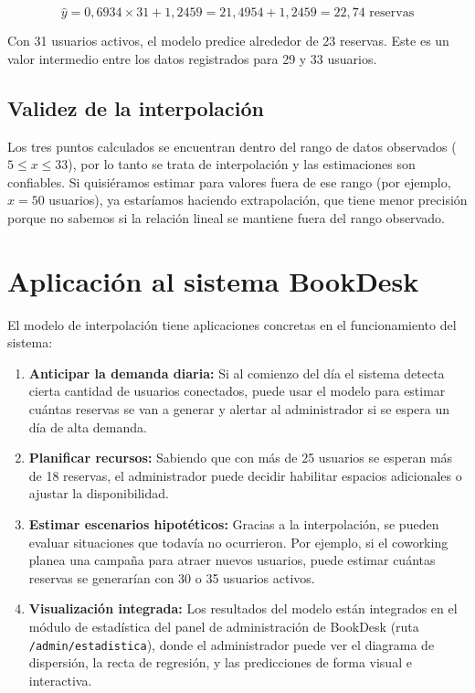 \documentclass[12pt,a4paper]{article}
\begin{document}
\vspace{4pt}
$$\hat{y} = 0{,}6934 \times 31 + 1{,}2459 = 21{,}4954 + 1{,}2459 = 22{,}74 \text{ reservas}$$
\vspace{4pt}

Con 31 usuarios activos, el modelo predice alrededor de 23 reservas. Este es un valor intermedio entre los datos registrados para 29 y 33 usuarios.

\subsection{Validez de la interpolación}

Los tres puntos calculados se encuentran dentro del rango de datos observados ($5 \leq x \leq 33$), por lo tanto se trata de interpolación y las estimaciones son confiables. Si quisiéramos estimar para valores fuera de ese rango (por ejemplo, $x = 50$ usuarios), ya estaríamos haciendo extrapolación, que tiene menor precisión porque no sabemos si la relación lineal se mantiene fuera del rango observado.

\section{Aplicación al sistema BookDesk}

El modelo de interpolación tiene aplicaciones concretas en el funcionamiento del sistema:

\begin{enumerate}[itemsep=10pt]
  \item \textbf{Anticipar la demanda diaria:} Si al comienzo del día el sistema detecta cierta cantidad de usuarios conectados, puede usar el modelo para estimar cuántas reservas se van a generar y alertar al administrador si se espera un día de alta demanda.

  \item \textbf{Planificar recursos:} Sabiendo que con más de 25 usuarios se esperan más de 18 reservas, el administrador puede decidir habilitar espacios adicionales o ajustar la disponibilidad.

  \item \textbf{Estimar escenarios hipotéticos:} Gracias a la interpolación, se pueden evaluar situaciones que todavía no ocurrieron. Por ejemplo, si el coworking planea una campaña para atraer nuevos usuarios, puede estimar cuántas reservas se generarían con 30 o 35 usuarios activos.

  \item \textbf{Visualización integrada:} Los resultados del modelo están integrados en el módulo de estadística del panel de administración de BookDesk (ruta \texttt{/admin/estadistica}), donde el administrador puede ver el diagrama de dispersión, la recta de regresión, y las predicciones de forma visual e interactiva.
\end{enumerate}
\end{document}
